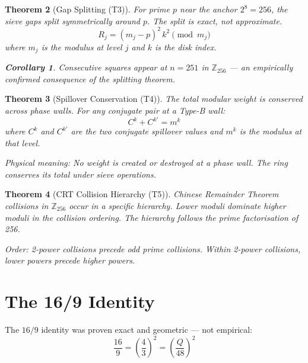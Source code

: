 \documentclass[12pt,a4paper]{article}
\newtheorem{theorem}{Theorem}[section]
\newtheorem{corollary}[theorem]{Corollary}
\theoremstyle{definition}
\begin{document}
\begin{theorem}[Gap Splitting (T3)]
For prime $p$ near the anchor $2^{8} = 256$, the sieve gaps split symmetrically around $p$. The split is exact, not approximate.
\begin{equation}
  R_{j} = (m_{j} - p)^{2}\,k^{2} \pmod{m_{j}}
\end{equation}
where $m_{j}$ is the modulus at level $j$ and $k$ is the disk index.

\begin{corollary}
Consecutive squares appear at $n = 251$ in $\mathbb{Z}_{256}$ --- an empirically confirmed consequence of the splitting theorem.
\end{corollary}
\end{theorem}

\begin{theorem}[Spillover Conservation (T4)]
The total modular weight is conserved across phase walls. For any conjugate pair at a Type-B wall:
\begin{equation}
  C^{k} + C^{k\prime} = m^{k}
\end{equation}
where $C^{k}$ and $C^{k\prime}$ are the two conjugate spillover values and $m^{k}$ is the modulus at that level.

\textit{Physical meaning:} No weight is created or destroyed at a phase wall. The ring conserves its total under sieve operations.
\end{theorem}

\begin{theorem}[CRT Collision Hierarchy (T5)]
Chinese Remainder Theorem collisions in $\mathbb{Z}_{256}$ occur in a specific hierarchy. Lower moduli dominate higher moduli in the collision ordering. The hierarchy follows the prime factorisation of 256.

\textit{Order:} 2-power collisions precede odd prime collisions. Within 2-power collisions, lower powers precede higher powers.
\end{theorem}

\section{The 16/9 Identity}

The $16/9$ identity was proven exact and geometric --- not empirical:
\begin{equation}
  \frac{16}{9} = \left(\frac{4}{3}\right)^{2} = \left(\frac{Q}{48}\right)^{2}
\end{equation}
\end{document}
